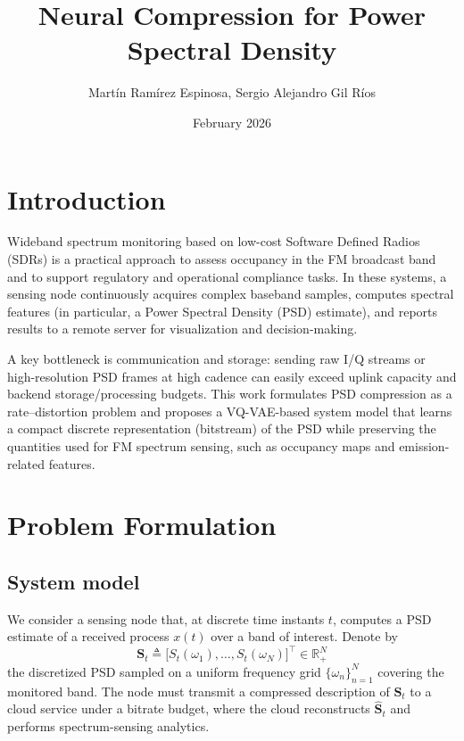 \documentclass[11pt]{article}
\title{Neural Compression for Power Spectral Density}
\author{Martín Ramírez Espinosa, Sergio Alejandro Gil Ríos}
\date{February 2026}
\begin{document}
\maketitle

\bigskip
\section{Introduction}
Wideband spectrum monitoring based on low-cost Software Defined Radios (SDRs) is a practical approach to assess occupancy in the FM broadcast band and to support regulatory and operational compliance tasks. In these systems, a sensing node continuously acquires complex baseband samples, computes spectral features (in particular, a Power Spectral Density (PSD) estimate), and reports results to a remote server for visualization and decision-making.

A key bottleneck is communication and storage: sending raw I/Q streams or high-resolution PSD frames at high cadence can easily exceed uplink capacity and backend storage/processing budgets. This work formulates PSD compression as a rate--distortion problem and proposes a VQ-VAE-based system model that learns a compact discrete representation (bitstream) of the PSD while preserving the quantities used for FM spectrum sensing, such as occupancy maps and emission-related features.

\section{Problem Formulation}

\subsection{System model}
We consider a sensing node that, at discrete time instants $t$, computes a PSD estimate of a received process $x(t)$ over a band of interest. Denote by
\begin{equation}
\mathbf{S}_t \triangleq \big[S_t(\omega_1),\ldots,S_t(\omega_N)\big]^\top \in \mathbb{R}_+^N
\end{equation}
the discretized PSD sampled on a uniform frequency grid $\{\omega_n\}_{n=1}^N$ covering the monitored band. The node must transmit a compressed description of $\mathbf{S}_t$ to a cloud service under a bitrate budget, where the cloud reconstructs $\hat{\mathbf{S}}_t$ and performs spectrum-sensing analytics.

\vspace{2mm}
\end{document}
